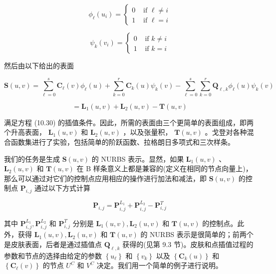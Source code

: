 \documentclass[../main.tex]{subfiles}
\begin{document}
\[
{\phi }_{\ell }\left( {u}_{i}\right)  = \left\{  \begin{array}{ll} 0 & \text{ if }\ell  \neq  i \\  1 & \text{ if }\ell  = i \end{array}\right.
\]

\[
{\psi }_{k}\left( {v}_{i}\right)  = \left\{  \begin{array}{ll} 0 & \text{ if }k \neq  i \\  1 & \text{ if }k = i \end{array}\right.  \tag{10.31}
\]

然后由以下给出的表面

\[
\mathbf{S}\left( {u,v}\right)  = \mathop{\sum }\limits_{{\ell  = 0}}^{s}{\mathbf{C}}_{\ell }\left( v\right) {\phi }_{\ell }\left( u\right)  + \mathop{\sum }\limits_{{k = 0}}^{r}{\mathbf{C}}_{k}\left( u\right) {\psi }_{k}\left( v\right)  - \mathop{\sum }\limits_{{\ell  = 0}}^{s}\mathop{\sum }\limits_{{k = 0}}^{r}{\mathbf{Q}}_{\ell ,k}{\phi }_{\ell }\left( u\right) {\psi }_{k}\left( v\right)
\]

\[
= {\mathbf{L}}_{1}\left( {u,v}\right)  + {\mathbf{L}}_{2}\left( {u,v}\right)  - \mathbf{T}\left( {u,v}\right)  \tag{10.32}
\]

满足方程 (10.30) 的插值条件。因此，所需的表面由三个更简单的表面组成，即两个升高表面， \({\mathbf{L}}_{1}\left( {u,v}\right)\) 和 \({\mathbf{L}}_{2}\left( {u,v}\right)\) ，以及张量积， \(\mathbf{T}\left( {u,v}\right)\) 。戈登对各种混合函数集进行了实验，包括简单的阶跃函数、拉格朗日多项式和三次样条。

我们的任务是生成 \(\mathbf{S}\left( {u,v}\right)\) 的 NURBS 表示。显然，如果 \({\mathbf{L}}_{1}\left( {u,v}\right)\) 、 \({\mathbf{L}}_{2}\left( {u,v}\right)\) 和 \(\mathbf{T}\left( {u,v}\right)\) 在 B 样条意义上都是兼容的(定义在相同的节点向量上)，那么可以通过对它们的控制点应用相应的操作进行加法和减法，即 \(\mathbf{S}\left( {u,v}\right)\) 的控制点 \({\mathbf{P}}_{i,j}\) 通过以下方式计算

\[
{\mathbf{P}}_{i,j} = {\mathbf{P}}_{i,j}^{{L}_{1}} + {\mathbf{P}}_{i,j}^{{L}_{2}} - {\mathbf{P}}_{i,j}^{T} \tag{10.33}
\]

其中 \({\mathbf{P}}_{i,j}^{{L}_{1}},{\mathbf{P}}_{i,j}^{{L}_{2}}\) 和 \({\mathbf{P}}_{i,j}^{T}\) 分别是 \({\mathbf{L}}_{1}\left( {u,v}\right) ,{\mathbf{L}}_{2}\left( {u,v}\right)\) 和 \(\mathbf{T}\left( {u,v}\right)\) 的控制点。此外，获得 \({\mathbf{L}}_{1}\left( {u,v}\right) ,{\mathbf{L}}_{2}\left( {u,v}\right)\) 和 \(\mathbf{T}\left( {u,v}\right)\) 的 NURBS 表示是很简单的；前两个是皮肤表面，后者是通过插值点 \({\mathbf{Q}}_{\ell ,k}\) 获得的(见第 9.3 节)。皮肤和点插值过程的参数和节点的选择由给定的参数 \(\left\{  {u}_{\ell }\right\}\) 和 \(\left\{  {v}_{k}\right\}\) 以及 \(\left\{  {{\mathbf{C}}_{k}\left( u\right) }\right\}\) 和 \(\left\{  {{\mathbf{C}}_{\ell }\left( v\right) }\right\}\) 的节点 \({U}^{C}\) 和 \({V}^{C}\) 决定。我们用一个简单的例子进行说明。
\end{document}
